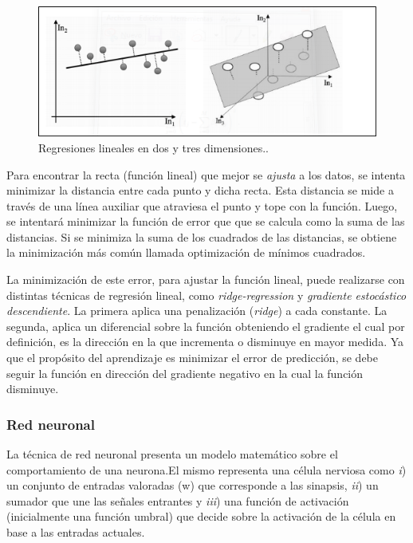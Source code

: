 \begin{figure}
\begin{centering}
\includegraphics[scale=0.85]{images/regression-lineal}
\par\end{centering}

\caption{Regresiones lineales en dos y tres dimensiones.. \label{fig:regression-lineal}}
\end{figure}


Para encontrar la recta (función lineal) que mejor se \emph{ajusta}
a los datos, se intenta minimizar la distancia entre cada punto y
dicha recta. Esta distancia se mide a través de una línea auxiliar
que atraviesa el punto y tope con la función. Luego, se intentará
minimizar la función de error que que se calcula como la suma de las
distancias. Si se minimiza la suma de los cuadrados de las distancias,
se obtiene la minimización más común llamada optimización de mínimos
cuadrados. 

La minimización de este error, para ajustar la función lineal, puede
realizarse con distintas técnicas de regresión lineal, como \emph{ridge-regression
}y \emph{gradiente estocástico descendiente}. La primera aplica una
penalización (\emph{ridge}) a cada constante. La segunda, aplica un
diferencial sobre la función obteniendo el gradiente el cual por definición,
es la dirección en la que incrementa o disminuye en mayor medida.
Ya que el propósito del aprendizaje es minimizar el error de predicción,
se debe seguir la función en dirección del gradiente negativo en la
cual la función disminuye. 


\subsubsection{Red neuronal}

La técnica de red neuronal presenta un modelo matemático sobre el
comportamiento de una neurona.El mismo representa una célula nerviosa
como \emph{i}) un conjunto de entradas valoradas (w) que corresponde
a las sinapsis, \emph{ii}) un sumador que une las señales entrantes
y \emph{iii}) una función de activación (inicialmente una función
umbral) que decide sobre la activación de la célula en base a las
entradas actuales. 

